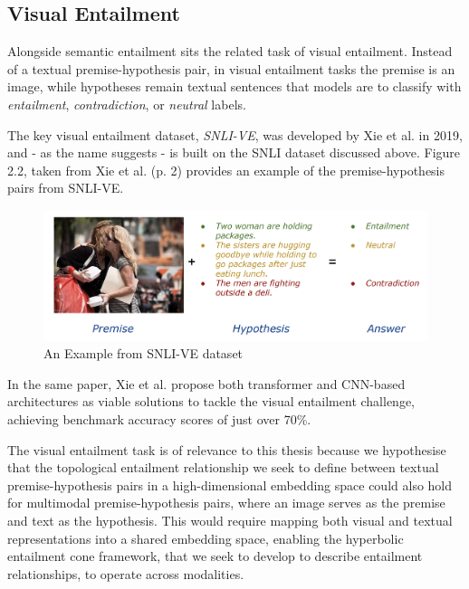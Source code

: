 \documentclass[12pt,twoside]{report}
\begin{document}
\subsection{Visual Entailment}

Alongside semantic entailment sits the related task of visual entailment. Instead of a textual premise-hypothesis pair, in visual entailment tasks the premise is an image, while hypotheses remain textual sentences that models are to classify with \textit{entailment}, \textit{contradiction}, or \textit{neutral} labels. \newline \par

The key visual entailment dataset, \textit{SNLI-VE}, was developed by Xie et al.\cite{xie2019visualentailmentnoveltask} in 2019, and - as the name suggests - is built on the SNLI dataset discussed above. Figure 2.2, taken from Xie et al. (p. 2) \cite{xie2019visualentailmentnoveltask} provides an example of the premise-hypothesis pairs from SNLI-VE. 

\begin{figure}[H]
\centering
\includegraphics[width = 1\hsize]{./figures/SNLI-VE.png}
\caption{An Example from SNLI-VE dataset}
\label{fig:SNLI-VE}
\end{figure}

In the same paper, Xie et al. propose both transformer and CNN-based architectures as viable solutions to tackle the visual entailment challenge, achieving benchmark accuracy scores of just over 70\%.

The visual entailment task is of relevance to this thesis because we hypothesise that the topological entailment relationship we seek to define between textual premise-hypothesis pairs in a high-dimensional embedding space could also hold for multimodal premise-hypothesis pairs, where an image serves as the premise and text as the hypothesis. This would require mapping both visual and textual representations into a shared embedding space, enabling the hyperbolic entailment cone framework, that we seek to develop to describe entailment relationships, to operate across modalities.
\end{document}
